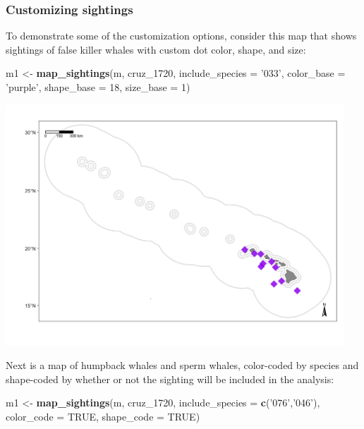 \documentclass[
]{book}
\newenvironment{Shaded}{\begin{snugshade}}{\end{snugshade}}
\newcommand{\DataTypeTok}[1]{\textcolor[rgb]{0.13,0.29,0.53}{#1}}
\newcommand{\DecValTok}[1]{\textcolor[rgb]{0.00,0.00,0.81}{#1}}
\newcommand{\KeywordTok}[1]{\textcolor[rgb]{0.13,0.29,0.53}{\textbf{#1}}}
\newcommand{\NormalTok}[1]{#1}
\newcommand{\OtherTok}[1]{\textcolor[rgb]{0.56,0.35,0.01}{#1}}
\newcommand{\StringTok}[1]{\textcolor[rgb]{0.31,0.60,0.02}{#1}}
\begin{document}
\hypertarget{customizing-sightings}{%
\subsubsection*{Customizing sightings}\label{customizing-sightings}}

To demonstrate some of the customization options, consider this map that shows sightings of false killer whales with custom dot color, shape, and size:

\begin{Shaded}
\begin{Highlighting}[]
\NormalTok{m1 <-}\StringTok{ }\KeywordTok{map_sightings}\NormalTok{(m,}
\NormalTok{                    cruz_}\DecValTok{1720}\NormalTok{,}
                    \DataTypeTok{include_species =} \StringTok{'033'}\NormalTok{,}
                    \DataTypeTok{color_base =} \StringTok{'purple'}\NormalTok{,}
                    \DataTypeTok{shape_base =} \DecValTok{18}\NormalTok{,}
                    \DataTypeTok{size_base =} \DecValTok{1}\NormalTok{)}
\end{Highlighting}
\end{Shaded}

\includegraphics[width=0.95\textwidth,height=\textheight]{img/map_sits2.png}

Next is a map of humpback whales and sperm whales, color-coded by species and shape-coded by whether or not the sighting will be included in the analysis:

\begin{Shaded}
\begin{Highlighting}[]
\NormalTok{m1 <-}\StringTok{ }\KeywordTok{map_sightings}\NormalTok{(m, }
\NormalTok{                   cruz_}\DecValTok{1720}\NormalTok{,}
                   \DataTypeTok{include_species =} \KeywordTok{c}\NormalTok{(}\StringTok{'076'}\NormalTok{,}\StringTok{'046'}\NormalTok{),}
                   \DataTypeTok{color_code =} \OtherTok{TRUE}\NormalTok{,}
                   \DataTypeTok{shape_code =} \OtherTok{TRUE}\NormalTok{)}
\end{Highlighting}
\end{Shaded}
\end{document}
